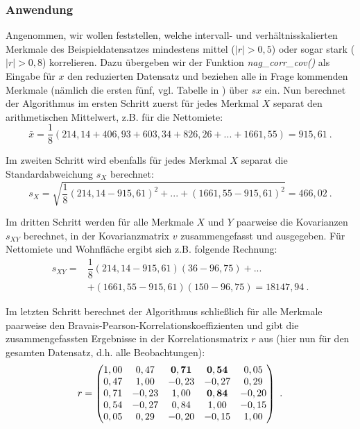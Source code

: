 \subsubsection{Anwendung}
\label{sec:brav_pear_korr_anw}

Angenommen, wir wollen feststellen, welche intervall- und verhältnisskalierten Merkmale des Beispieldatensatzes mindestens mittel ($|r|>0,5$) oder sogar stark ($|r|>0,8$) korrelieren. Dazu übergeben wir der Funktion {\it nag\_corr\_cov()} als Eingabe für $x$ den reduzierten Datensatz und beziehen alle in Frage kommenden Merkmale (nämlich die ersten fünf, vgl. Tabelle in ) über $sx$ ein. Nun berechnet der Algorithmus im ersten Schritt zuerst für jedes Merkmal $X$ separat den arithmetischen Mittelwert, z.B. für die Nettomiete:
\begin{equation*}
	\bar{x}=\dfrac{1}{8}(214,14+406,93+603,34+826,26+...+1661,55)=915,61 ~.
\end{equation*}

\noindent Im zweiten Schritt wird ebenfalls für jedes Merkmal $X$ separat die Standardabweichung $s_X$ berechnet:
\begin{equation*}
	s_X=\sqrt{\dfrac{1}{8}(214,14-915,61)^2+...+(1661,55-915,61)^2}=466,02 ~.
\end{equation*}

\noindent Im dritten Schritt werden für alle Merkmale $X$ und $Y$ paarweise die Kovarianzen $s_{XY}$ berechnet, in der Kovarianzmatrix $v$ zusammengefasst und ausgegeben. Für Nettomiete und Wohnfläche ergibt sich z.B. folgende Rechnung:
\begin{equation*}
	\begin{split}
		s_{XY}=& \dfrac{1}{8}(214,14-915,61)(36-96,75)+...\\
		& +(1661,55-915,61)(150-96,75)=18147,94 ~.
	\end{split}
\end{equation*}

\noindent Im letzten Schritt berechnet der Algorithmus schließlich für alle Merkmale paarweise den Bravais-Pearson-Korrelationskoeffizienten und gibt die zusammengefassten Ergebnisse in der Korrelationsmatrix $r$ aus (hier nun für den gesamten Datensatz, d.h. alle Beobachtungen):
\begin{equation*}
	r =
	\begin{pmatrix}
		1,00 & 0,47 & {\bf 0,71} & {\bf 0,54} & 0,05\\
 		0,47 & 1,00 & -0,23 & -0,27 & 0,29\\
 		0,71 & -0,23 & 1,00 & {\bf 0,84} & -0,20\\
		0,54 & -0,27 & 0,84 & 1,00 & -0,15\\
  		0,05 &  0,29 & -0,20 & -0,15 & 1,00\\
	\end{pmatrix} ~.
\end{equation*}

